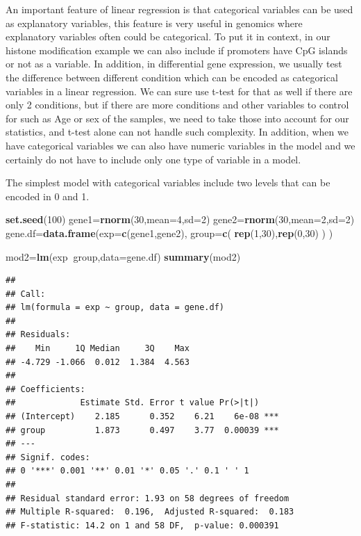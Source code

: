 \documentclass[12pt,]{krantz}
\newenvironment{Shaded}{\begin{snugshade}}{\end{snugshade}}
\newcommand{\DataTypeTok}[1]{\textcolor[rgb]{0.13,0.29,0.53}{#1}}
\newcommand{\DecValTok}[1]{\textcolor[rgb]{0.00,0.00,0.81}{#1}}
\newcommand{\KeywordTok}[1]{\textcolor[rgb]{0.13,0.29,0.53}{\textbf{#1}}}
\newcommand{\NormalTok}[1]{#1}
\newcommand{\OperatorTok}[1]{\textcolor[rgb]{0.81,0.36,0.00}{\textbf{#1}}}
\begin{document}
An important feature of linear regression is that categorical variables can
be used as explanatory variables, this feature is very useful in genomics
where explanatory variables often could be categorical. To put it in
context, in our histone modification example we can also include if
promoters have CpG islands or not as a variable. In addition, in
differential gene expression, we usually test the difference between
different condition which can be encoded as categorical variables in
a linear regression. We can sure use t-test for that as well if there
are only 2 conditions, but if there are more conditions and other variables
to control for such as Age or sex of the samples, we need to take those
into account for our statistics, and t-test alone can not handle such
complexity. In addition, when we have categorical variables we can also
have numeric variables in the model and we certainly do not have to include
only one type of variable in a model.

The simplest model with categorical variables include two levels that
can be encoded in 0 and 1.

\begin{Shaded}
\begin{Highlighting}[]
\KeywordTok{set.seed}\NormalTok{(}\DecValTok{100}\NormalTok{)}
\NormalTok{gene1=}\KeywordTok{rnorm}\NormalTok{(}\DecValTok{30}\NormalTok{,}\DataTypeTok{mean=}\DecValTok{4}\NormalTok{,}\DataTypeTok{sd=}\DecValTok{2}\NormalTok{)}
\NormalTok{gene2=}\KeywordTok{rnorm}\NormalTok{(}\DecValTok{30}\NormalTok{,}\DataTypeTok{mean=}\DecValTok{2}\NormalTok{,}\DataTypeTok{sd=}\DecValTok{2}\NormalTok{)}
\NormalTok{gene.df=}\KeywordTok{data.frame}\NormalTok{(}\DataTypeTok{exp=}\KeywordTok{c}\NormalTok{(gene1,gene2),}
                  \DataTypeTok{group=}\KeywordTok{c}\NormalTok{( }\KeywordTok{rep}\NormalTok{(}\DecValTok{1}\NormalTok{,}\DecValTok{30}\NormalTok{),}\KeywordTok{rep}\NormalTok{(}\DecValTok{0}\NormalTok{,}\DecValTok{30}\NormalTok{) ) )}

\NormalTok{mod2=}\KeywordTok{lm}\NormalTok{(exp}\OperatorTok{~}\NormalTok{group,}\DataTypeTok{data=}\NormalTok{gene.df)}
\KeywordTok{summary}\NormalTok{(mod2)}
\end{Highlighting}
\end{Shaded}

\begin{verbatim}
## 
## Call:
## lm(formula = exp ~ group, data = gene.df)
## 
## Residuals:
##    Min     1Q Median     3Q    Max 
## -4.729 -1.066  0.012  1.384  4.563 
## 
## Coefficients:
##             Estimate Std. Error t value Pr(>|t|)    
## (Intercept)    2.185      0.352    6.21    6e-08 ***
## group          1.873      0.497    3.77  0.00039 ***
## ---
## Signif. codes:  
## 0 '***' 0.001 '**' 0.01 '*' 0.05 '.' 0.1 ' ' 1
## 
## Residual standard error: 1.93 on 58 degrees of freedom
## Multiple R-squared:  0.196,  Adjusted R-squared:  0.183 
## F-statistic: 14.2 on 1 and 58 DF,  p-value: 0.000391
\end{verbatim}
\end{document}
